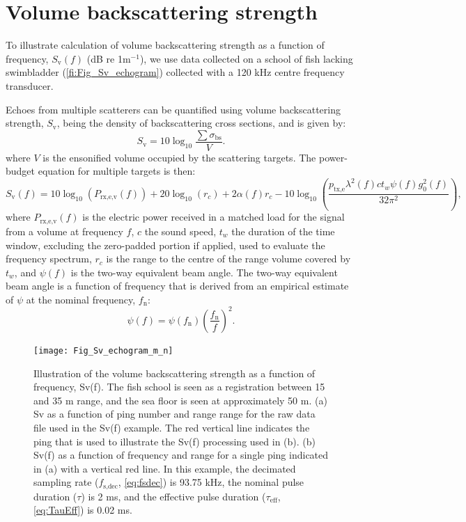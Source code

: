 \documentclass[preprint,12pt,TurnOnLineNumbers]{JASAnew}
\newcommand{\freqsym}{f}
\newcommand{\fsdec}{f_{\textrm{s,dec}}}
\newcommand{\fn}{f_{\textrm{n}}}
\newcommand{\ptxe}{p_{\textrm{tx,e}}}
\newcommand{\tnom}{\tau}
\newcommand{\teff}{\tau_{\textrm{eff}}}
\newcommand{\prxevf}{P_{\textrm{rx,e,v}}}
\newcommand{\tslide}{t_w}
\newcommand{\bs}{\sigma_{\textrm{bs}}}
\newcommand{\sv}{S_{\textrm{v}}}
\newcommand{\range}{r}
\newcommand{\gainzero}{g_0}
\newcommand{\eqang}{\psi}
\newcommand{\wlen}{\lambda}
\newcommand{\cw}{c}
\newcommand{\absorp}{\alpha}
\begin{document}
\section{Volume backscattering strength}

To illustrate calculation of volume backscattering strength as a function of frequency,  $\sv(f)$ (dB re 1m$^{-1}$), we use data collected on a school of fish lacking swimbladder (\autoref{fi:Fig_Sv_echogram}) collected with a 120 kHz centre frequency transducer. 

Echoes from multiple scatterers can be quantified using volume backscattering strength, $\sv$, being the density of backscattering cross sections, and is given by:
%
\begin{equation}
\label{eq:sv}
\sv  =  10\log_{10}\frac{\sum\bs}{V}.
\end{equation}
%
where $V$ is the ensonified volume occupied by the scattering targets. The power-budget equation for multiple targets is then:
%
\begin{equation}
\label{eq:sv_f}
\sv(\freqsym) = 10\log_{10}(\prxevf(\freqsym)) + 20\log_{10}(\range_c) + 2\absorp(\freqsym)\range_c 
- 10\log_{10}\left( \frac{\ptxe \wlen^2(\freqsym) \cw \tslide \eqang(\freqsym) \gainzero^2(\freqsym)}{32\pi^2} \right), 
\end{equation}
%
where $\prxevf(\freqsym)$ is the electric power received in a matched load for the signal from a volume at frequency $\freqsym$, $\cw$ the sound speed, $\tslide$ the duration of the time window, excluding the zero-padded portion if applied, used to evaluate the frequency spectrum, $\range_c$ is the range to the centre of the range volume covered by $\tslide$, and $\eqang(\freqsym)$ is the two-way equivalent beam angle. The two-way equivalent beam angle is a function of frequency that is derived from an empirical estimate of $\eqang$ at the nominal frequency, $\fn$:
\begin{equation}
\label{eq:PsiFc}
\eqang(f) = \eqang(\fn)\left(\frac{\fn}{f}\right)^2.
\end{equation}

\begin{figure}
\texttt{[image: Fig\_Sv\_echogram\_m\_n]}
\caption{\label{fi:Fig_Sv_echogram} Illustration of the volume backscattering strength as a function of frequency, Sv(f). The fish school is seen as a registration between 15 and 35 m range, and the sea floor is seen at approximately 50 m. (a) Sv as a function of ping number and range range for the raw data file used in the Sv(f) example. The red vertical line indicates the ping that is used to illustrate the Sv(f) processing used in (b). (b) Sv(f) as a function of frequency and range for a single ping indicated in (a) with a vertical red line. In this example, the decimated sampling rate ($\fsdec$, \autoref{eq:fsdec}) is 93.75 kHz, the nominal pulse duration ($\tnom$) is 2 ms, and the effective pulse duration ($\teff$, \autoref{eq:TauEff}) is 0.02 ms.}
\end{figure}
\end{document}
